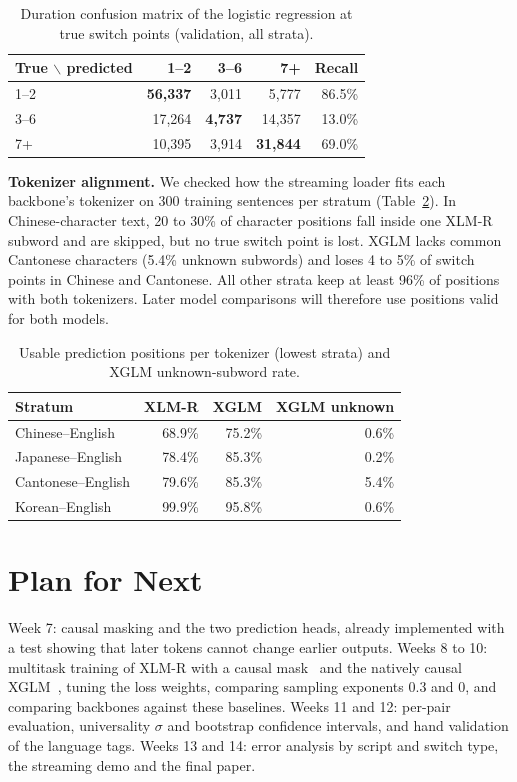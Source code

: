 \documentclass[sigconf,nonacm]{acmart}
\begin{document}
\begin{table}[t]
\caption{Duration confusion matrix of the logistic regression at true switch points (validation, all strata).}
\label{tab:cm}
\small
\begin{tabular}{lrrrr}
\toprule
True $\backslash$ predicted & 1--2 & 3--6 & 7+ & Recall \\
\midrule
1--2 & \textbf{56,337} & 3,011 & 5,777 & 86.5\% \\
3--6 & 17,264 & \textbf{4,737} & 14,357 & 13.0\% \\
7+ & 10,395 & 3,914 & \textbf{31,844} & 69.0\% \\
\bottomrule
\end{tabular}
\end{table}

\textbf{Tokenizer alignment.} We checked how the streaming loader fits each backbone's tokenizer on 300
training sentences per stratum (Table~\ref{tab:align}). In Chinese-character text, 20 to 30\% of character
positions fall inside one XLM-R subword and are skipped, but no true switch point is lost. XGLM lacks common
Cantonese characters (5.4\% unknown subwords) and loses 4 to 5\% of switch points in Chinese and Cantonese.
All other strata keep at least 96\% of positions with both tokenizers. Later model comparisons will therefore
use positions valid for both models.

\begin{table}[t]
\caption{Usable prediction positions per tokenizer (lowest strata) and XGLM unknown-subword rate.}
\label{tab:align}
\small
\setlength{\tabcolsep}{4pt}
\begin{tabular}{lrrr}
\toprule
Stratum & XLM-R & XGLM & XGLM unknown \\
\midrule
Chinese--English & 68.9\% & 75.2\% & 0.6\% \\
Japanese--English & 78.4\% & 85.3\% & 0.2\% \\
Cantonese--English & 79.6\% & 85.3\% & 5.4\% \\
Korean--English & 99.9\% & 95.8\% & 0.6\% \\
\bottomrule
\end{tabular}
\end{table}

\section{Plan for Next}
Week 7: causal masking and the two prediction heads, already implemented with a test showing that later
tokens cannot change earlier outputs. Weeks 8 to 10: multitask training of XLM-R with a causal
mask~\cite{conneau2020xlmr} and the natively causal XGLM~\cite{lin2022xglm}, tuning the loss weights,
comparing sampling exponents 0.3 and 0, and comparing backbones against these baselines. Weeks 11 and 12:
per-pair evaluation, universality $\sigma$ and bootstrap confidence intervals, and hand validation of the
language tags. Weeks 13 and 14: error analysis by script and switch type, the streaming demo and the final
paper.



\end{document}
